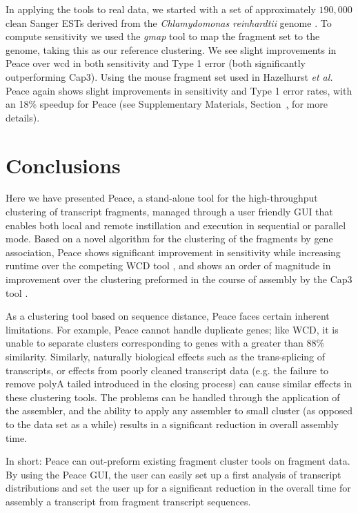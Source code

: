 \documentclass[a4,center,fleqn]{NAR}
\begin{document}
In applying the tools to real data, we started with a set of
approximately $190,000$ clean Sanger ESTs derived from the {\it
  Chlamydomonas reinhardtii} genome \cite{Liang2008}.  To compute
sensitivity we used the {\it gmap} tool \cite{Wu05} to map the
fragment set to the genome, taking this as our reference clustering.
We see slight improvements in {\sc Peace} over {\sc wcd} in both
sensitivity and Type 1 error (both significantly outperforming {\sc
  Cap3}).  Using the mouse fragment set used in Hazelhurst {\it et
  al.}  \cite{Hazelhurst08a} {\sc Peace} again shows slight
improvements in sensitivity and Type 1 error rates, with an 18\% speedup
for {\sc Peace} (see Supplementary Materials,
Section~\href{real_results}, for more details).

\section{Conclusions}

Here we have presented {\sc Peace}, a stand-alone tool for the
high-throughput clustering of transcript fragments, managed through a
user friendly GUI that enables both local and remote instillation and
execution in sequential or parallel mode.  Based on a novel algorithm
for the clustering of the fragments by gene association, {\sc Peace}
shows significant improvement in sensitivity while increasing runtime
over the competing {\sc WCD} tool \cite{Hazelhurst08a}, and shows an
order of magnitude in improvement over the clustering preformed in the
course of assembly by the {\sc Cap3} tool \cite{Huang99}.

As a clustering tool based on sequence distance, {\sc Peace} faces
certain inherent limitations. For example, {\sc Peace} cannot handle
duplicate genes; like {\sc WCD}, it is unable to separate clusters
corresponding to genes with a greater than 88\% similarity.
Similarly, naturally biological effects such as the trans-splicing of
transcripts, or effects from poorly cleaned transcript data (e.g. the
failure to remove polyA tailed introduced in the closing process) can
cause similar effects in these clustering tools.  The problems can be
handled through the application of the assembler, and the ability to
apply any assembler to small cluster (as opposed to the data set as a
while) results in a significant reduction in overall assembly time.

In short: {\sc Peace} can out-preform existing fragment cluster tools
on fragment data.  By using the {\sc Peace} GUI, the user can easily
set up a first analysis of transcript distributions and set the user
up for a significant reduction in the overall time for assembly a
transcript from fragment transcript sequences.
\end{document}
